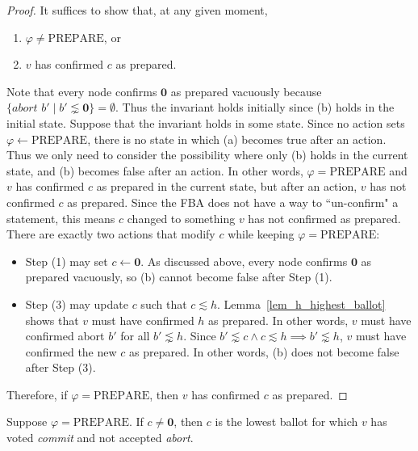 \begin{proof}
    It suffices to show that, at any given moment,
    \begin{enumerate}[label=(\alph*)]
        \item %
            $\varphi \ne \text{PREPARE}$, or
        \item %
            $v$ has confirmed $c$ as prepared.
    \end{enumerate}
    Note that every node confirms $\textbf{0}$ as prepared vacuously because $\{ \textit{abort } b' \mid b' \lnsim \textbf{0} \} = \emptyset$.
    Thus the invariant holds initially since (b) holds in the initial state.
    Suppose that the invariant holds in some state.
    Since no action sets $\varphi \leftarrow \text{PREPARE}$, there is no state in which (a) becomes true after an action.
    Thus we only need to consider the possibility where only (b) holds in the current state, and (b) becomes false after an action.
    In other words, $\varphi = \text{PREPARE}$ and $v$ has confirmed $c$ as prepared in the current state, but after an action, $v$ has not confirmed $c$ as prepared.
    Since the FBA does not have a way to ``un-confirm" a statement, this means $c$ changed to something $v$ has not confirmed as prepared.
    There are exactly two actions that modify $c$ while keeping $\varphi = \text{PREPARE}$:
    \begin{itemize}
        \item
            Step (1) may set $c \leftarrow \textbf{0}$.
            As discussed above, every node confirms $\textbf{0}$ as prepared vacuously, so (b) cannot become false after Step (1).
        \item
            Step (3) may update $c$ such that $c \lesssim h$.
            Lemma~\ref{lem_h_highest_ballot} shows that $v$ must have confirmed $h$ as prepared.
            In other words, $v$ must have confirmed abort $b'$ for all $b' \lnsim h$.
            Since $b' \lnsim c \land c \lesssim h \implies b' \lnsim h$, $v$ must have confirmed the new $c$ as prepared.
            In other words, (b) does not become false after Step (3).
    \end{itemize}
    Therefore, if $\varphi = \text{PREPARE}$, then $v$ has confirmed $c$ as prepared.
\end{proof}


\begin{thm}
    Suppose $\varphi = \text{PREPARE}$.
    If $c \ne \textbf{0}$, then $c$ is the lowest ballot for which $v$ has voted \textit{commit} and not accepted \textit{abort}.
\end{thm}

